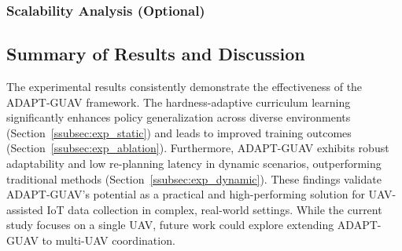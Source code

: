 \documentclass[10pt,conference,letterpaper]{IEEEtran}
\begin{document}

\subsubsection{Scalability Analysis (Optional)}
\label{ssubsec:exp_scalability}

\subsection{Summary of Results and Discussion}
\label{subsec:exp_summary}
The experimental results consistently demonstrate the effectiveness of the ADAPT-GUAV framework. The hardness-adaptive curriculum learning significantly enhances policy generalization across diverse environments (Section~\ref{ssubsec:exp_static}) and leads to improved training outcomes (Section~\ref{ssubsec:exp_ablation}). Furthermore, ADAPT-GUAV exhibits robust adaptability and low re-planning latency in dynamic scenarios, outperforming traditional methods (Section~\ref{ssubsec:exp_dynamic}). These findings validate ADAPT-GUAV's potential as a practical and high-performing solution for UAV-assisted IoT data collection in complex, real-world settings. While the current study focuses on a single UAV, future work could explore extending ADAPT-GUAV to multi-UAV coordination.
\end{document}
